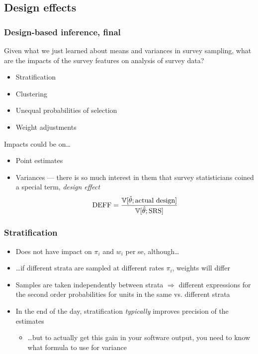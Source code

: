 \documentclass{beamer}
\newcommand{\Var}{\mathbb{V}}
\begin{document}
\subsection{Design effects}

\begin{frame}\frametitle{Design-based inference, final}

Given what we just learned about means and variances in survey sampling, what are the impacts of
the survey features on analysis of survey data?

\begin{itemize}
    \item Stratification
    \item Clustering
    \item Unequal probabilities of selection
    \item Weight adjustments
\end{itemize}

Impacts could be on\ldots
\begin{itemize}
    \item Point estimates
    \item Variances --- there is so much interest in them that survey statisticians coined a special term,
        \textit{design effect}
        $$
            {\rm DEFF} = \frac{\Var[\hat\theta; \mbox{actual design}]}{\Var[\hat\theta; \mbox{SRS}]}
        $$
\end{itemize}

\end{frame}

\begin{frame}\frametitle{Stratification}

\begin{itemize}
    \item Does not have impact on $\pi_i$ and $w_i$ per se, although\ldots
    \item \ldots if different strata are sampled at different rates $\pi_i$, weights will differ
    \item Samples are taken independently between strata $\Rightarrow$ different
        expressions for the second order probabilities for units in the same vs. different strata
    \item In the end of the day, stratification \textit{typically} improves precision of the estimates
        \begin{itemize}
            \item \ldots but to actually get this gain in your software output,
                you need to know what formula to use for variance
        \end{itemize}
\end{itemize}

\end{frame}
\end{document}
